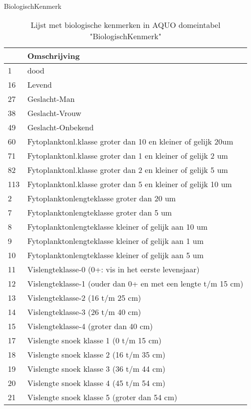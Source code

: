 \documentclass[
]{book}
\begin{document}
BiologischKenmerk

\begin{table}

\caption{\label{tab:unnamed-chunk-3}Lijst met biologische kenmerken in AQUO domeintabel "BiologischKenmerk"}
\centering
\begin{tabular}[t]{l|l}
\hline
  & Omschrijving\\
\hline
1 & dood\\
\hline
16 & Levend\\
\hline
27 & Geslacht-Man\\
\hline
38 & Geslacht-Vrouw\\
\hline
49 & Geslacht-Onbekend\\
\hline
60 & Fytoplanktonl.klasse groter dan 10 en kleiner of gelijk 20um\\
\hline
71 & Fytoplanktonl.klasse groter dan 1 en kleiner of gelijk 2 um\\
\hline
82 & Fytoplanktonl.klasse groter dan 2 en kleiner of gelijk 5 um\\
\hline
113 & Fytoplanktonl.klasse groter dan 5 en kleiner of gelijk 10 um\\
\hline
2 & Fytoplanktonlengteklasse groter dan 20 um\\
\hline
7 & Fytoplanktonlengteklasse groter dan 5 um\\
\hline
8 & Fytoplanktonlengteklasse kleiner of gelijk aan 10 um\\
\hline
9 & Fytoplanktonlengteklasse kleiner of gelijk aan 1 um\\
\hline
10 & Fytoplanktonlengteklasse kleiner of gelijk aan 5 um\\
\hline
11 & Vislengteklasse-0 (0+: vis in het eerste levensjaar)\\
\hline
12 & Vislengteklasse-1 (ouder dan 0+ en met een lengte t/m 15 cm)\\
\hline
13 & Vislengteklasse-2 (16 t/m 25 cm)\\
\hline
14 & Vislengteklasse-3 (26 t/m 40 cm)\\
\hline
15 & Vislengteklasse-4 (groter dan 40 cm)\\
\hline
17 & Vislengte snoek klasse 1 (0 t/m 15 cm)\\
\hline
18 & Vislengte snoek klasse 2 (16 t/m 35 cm)\\
\hline
19 & Vislengte snoek klasse 3 (36 t/m 44 cm)\\
\hline
20 & Vislengte snoek klasse 4 (45 t/m 54 cm)\\
\hline
21 & Vislengte snoek klasse 5 (groter dan 54 cm)\\

\end{tabular}
\end{table}
\end{document}
